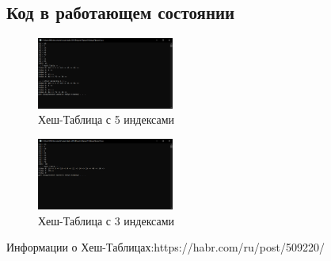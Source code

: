 \documentclass{article}
\begin{document}
\subsection{Код в работающем состоянии}
\begin{figure}[h]
	\centering
	\includegraphics[width=0.4\textwidth]{index5.png}
	\caption{Хеш-Таблица с 5 индексами}\label{fig:par}
\end{figure}
\begin{figure}[h]
	\centering
	\includegraphics[width=0.4\textwidth]{Index3.png}
	\caption{Хеш-Таблица с 3 индексами}\label{fig:par}
\end{figure}





Информации о Хеш-Таблицах:https://habr.com/ru/post/509220/
\end{document}
